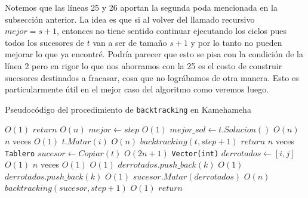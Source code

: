   Notemos que las líneas 25 y 26 aportan la segunda poda mencionada en la subsección anterior. La idea es que si al volver del llamado recursivo $mejor = s+1$, entonces no tiene sentido continuar ejecutando los ciclos pues todos los sucesores de $t$ van a ser de tamaño $s+1$ y por lo tanto no pueden mejorar lo que ya encontré. Podría parecer que esto se pisa con la condición de la línea 2 pero en rigor lo que nos ahorramos con la 25 es el costo de construir sucesores destinados a fracasar, cosa que no lográbamos de otra manera. Esto es particularmente útil en el mejor caso del algoritmo como veremos luego.
  
  \begin{algorithm}[H]
  \begin{algorithmic}[1]
  \label{algo:backtracking}
  \caption{Pseudocódigo del procedimiento de \texttt{backtracking} en Kamehameha}
    \Comment $O(1)$
      \State $return$
    \EndIf
    \Comment $O(n)$
      \State $mejor \gets step$
      \Comment $O(1)$
      \State $mejor\_sol \gets t.Solucion()$
      \Comment $O(n)$
    \Else
      \For {$i \in [0,..., n),$ $t.EstaVivo?(i)$}
      \Comment $n$ veces
        \Comment $O(1)$
          \State $t.Matar(i)$
          \Comment $O(n)$
          \State $backtracking(t, step+1)$
          \State $return$
        \EndIf
        \For {$j \in [0,..., n),$ $j \neq i \land t.EstaVivo?(j)$}
          \Comment $n$ veces
          \State \texttt{Tablero} $sucesor \gets Copiar(t)$
          \Comment $O(2n+1)$
          \State \texttt{Vector(int)} $derrotados \gets [i, j]$
          \Comment $O(1)$ 
          \For {$k \in [0,..., n),$ $k \neq i \land k \neq j \land t.EstaVivo?(k)$}
          \Comment $n$ veces
            \Comment $O(1)$
              \Comment $O(1)$
                \State $derrotados.push\_back(k)$ 
                \Comment $O(1)$ \footnotemark
              \EndIf
            \Else 
              \normalsize
                \State $derrotados.push\_back(k)$
                \Comment $O(1)$
              \EndIf
            \EndIf
          \EndFor
          \State $sucesor.Matar(derrotados)$
          \Comment $O(n)$
          \State $backtracking(sucesor, step+1)$
            \Comment $O(1)$
            \State $return$
          \EndIf
        \EndFor
      \EndFor
    \EndIf
    \EndProcedure
  \end{algorithmic}
  \end{algorithm}

